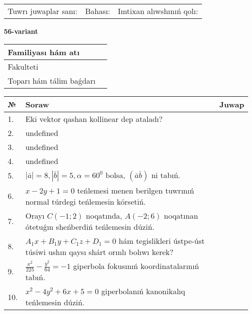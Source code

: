 \documentclass{article}
\begin{document}
\vspace{0.7cm}

\begin{tabular}{lll}
Tuwrı juwaplar sanı: \underline{\hspace{1cm}} & 
Bahası: \underline{\hspace{1cm}} & 
Imtixan alıwshınıń qolı: \underline{\hspace{2cm}} \\
\end{tabular}

\egroup

\newpage


\textbf{56-variant}\\

\bgroup
\def\arraystretch{1.6} %

\begin{tabular}{|m{5.7cm}|m{9.5cm}|}
\hline
Familiyası hám atı & \\
\hline
Fakulteti  & \\
\hline
Toparı hám tálim baǵdarı  & \\
\hline
\end{tabular}

\vspace{0.7cm}

\begin{tabular}{|m{0.7cm}|m{10cm}|m{4cm}|}
\hline
№ & Soraw & Juwap \\
\hline
1. & Eki vektor qashan kollinear dep ataladı? &  \\
\hline
2. & undefined &  \\
\hline
3. & undefined &  \\
\hline
4. & undefined &  \\
\hline
5. & \(\left| \bar{a} \right| = 8, \left| \bar{b} \right| = 5, \alpha = 60^{0}\) bolsa, \(( \bar{a}\bar{b} )\) ni tabıń. &  \\
\hline
6. & \(x - 2 y + 1 = 0\) teńlemesi menen berilgen tuwrınıń normal túrdegi teńlemesin kórsetiń. &  \\
\hline
7. & Orayı \(C (- 1;2)\) noqatında, \(A (- 2;6 )\) noqatınan ótetuǵın sheńberdiń teńlemesin dúziń. &  \\
\hline
8. & \(A_{1}x + B_{1}y + C_{1}z + D_{1} = 0\) hám tegislikleri ústpe-úst túsiwi ushın qaysı shárt orınlı bolıwı kerek? &  \\
\hline
9. & \(\frac{x^{2}}{225} - \frac{y^{2}}{64} = - 1\) giperbola fokusınıń koordinatalarınıń tabıń. &  \\
\hline
10. & \(x^{2} - 4 y^{2} + 6 x + 5 = 0\) giperbolanıń kanonikalıq teńlemesin dúziń. & \\
\hline
\end{tabular}
\end{document}
